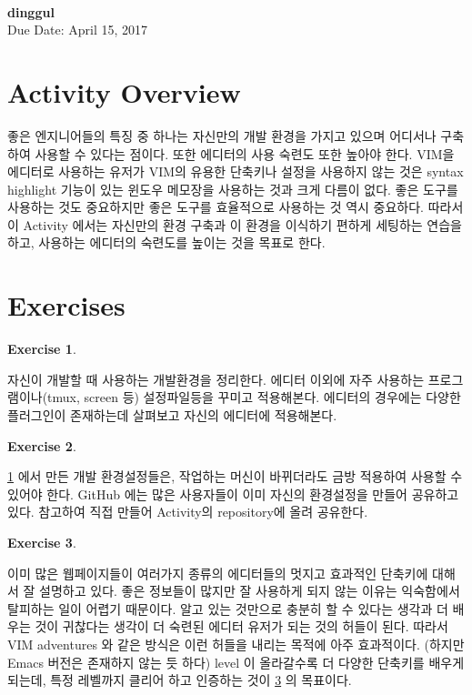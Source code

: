 \documentclass[a4paper, 11pt]{article}
\theoremstyle{definition}
\newtheorem{exercise}{Exercise}
\begin{document}
 \\
         {\phantom{} \hfill \textbf{dinggul}} \\
         {\phantom{} \hfill Due Date: April 15, 2017} \\

\section{Activity Overview}

좋은 엔지니어들의 특징 중 하나는 자신만의 개발 환경을 가지고 있으며
어디서나 구축하여 사용할 수 있다는 점이다. 또한 에디터의 사용 숙련도
또한 높아야 한다. VIM을 에디터로 사용하는 유저가 VIM의 유용한 단축키나
설정을 사용하지 않는 것은 syntax highlight 기능이 있는 윈도우 메모장을
사용하는 것과 크게 다름이 없다. 좋은 도구를 사용하는 것도 중요하지만
좋은 도구를 효율적으로 사용하는 것 역시 중요하다. 따라서 이 Activity
에서는 자신만의 환경 구축과 이 환경을 이식하기 편하게 세팅하는 연습을 하고,
사용하는 에디터의 숙련도를 높이는 것을 목표로 한다.


\section{Exercises}

\begin{exercise} \label{ex:mkset}

  자신이 개발할 때 사용하는 개발환경을 정리한다. 에디터 이외에 자주 사용하는
  프로그램이나(tmux, screen 등) 설정파일등을 꾸미고 적용해본다. 에디터의
  경우에는 다양한 플러그인이 존재하는데 살펴보고 자신의 에디터에 적용해본다.

\end{exercise}

\begin{exercise} \label{ex:dotfiles}

  \cref{ex:mkset} 에서 만든 개발 환경설정들은, 작업하는 머신이 바뀌더라도
  금방 적용하여 사용할 수 있어야 한다. GitHub 에는 많은 사용자들이 이미
  자신의 환경설정을 만들어 공유하고 있다.\cite{dotfiles} 참고하여 직접 만들어
  Activity의 repository에 올려 공유한다.

\end{exercise}

\begin{exercise} \label{ex:adven}

  이미 많은 웹페이지들이 여러가지 종류의 에디터들의 멋지고 효과적인
  단축키에 대해서 잘 설명하고 있다.\cite{usefulVIM} 좋은 정보들이 많지만
  잘 사용하게 되지 않는 이유는 익숙함에서 탈피하는 일이 어렵기 때문이다.
  알고 있는 것만으로 충분히 할 수 있다는 생각과 더 배우는 것이 귀찮다는 생각이
  더 숙련된 에디터 유저가 되는 것의 허들이 된다. 따라서 VIM adventures
  \cite{vimAdventures} 와 같은 방식은 이런 허들을 내리는 목적에 아주 효과적이다.
  (하지만 Emacs 버전은 존재하지 않는 듯 하다) level 이 올라갈수록 더 다양한
  단축키를 배우게 되는데, 특정 레벨까지 클리어 하고 인증하는 것이 \cref{ex:adven}
  의 목표이다.

\end{exercise}
\end{document}
